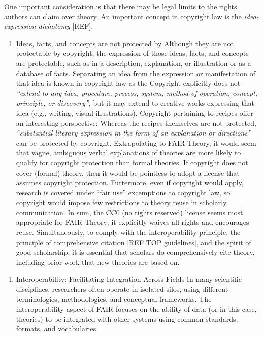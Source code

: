 \documentclass[
  man]{apa6}
\providecommand{\tightlist}{%
  \setlength{\itemsep}{0pt}\setlength{\parskip}{0pt}}
\begin{document}
One important consideration is that there may be legal limits to the rights authors can claim over theory.
An important concept in copyright law is the \emph{idea-expression dichotomy} {[}REF{]}.

\begin{enumerate}
\def\labelenumi{\alph{enumi}.}
\setcounter{enumi}{14}
\tightlist
\item
  Ideas, facts, and concepts are not protected by Although they are not protectable by copyright, the expression of those ideas, facts, and concepts are protectable, such as in a description, explanation, or illustration or as a database of facts. Separating an idea from the expression or manifestation of that idea is known in copyright law as the
  Copyright explicitly does not
  \emph{``extend to any idea, procedure, process, system, method of operation, concept, principle, or discovery''},
  but it may extend to creative works expressing that idea (e.g., writing, visual illustrations).
  Copyright pertaining to recipes offer an interesting perspective:
  Whereas the recipes themselves are not protected, \emph{``substantial literary expression in the form of an explanation or directions''} can be protected by copyright.
  Extrapolating to FAIR Theory, it would seem that vague, ambiguous verbal explanations of theories are more likely to qualify for copyright protection than formal theories.
  If copyright does not cover (formal) theory,
  then it would be pointless to adopt a license that assumes copyright protection.
  Furtermore, even if copyright would apply, research is covered under ``fair use'' excemptions to copyright law, so copyright would impose few restrictions to theory reuse in scholarly communication.
  In sum, the CC0 (no rights reserved) license seems most appropriate for FAIR Theory;
  it explicitly waives all rights and encourages reuse.
  Simultaneously, to comply with the interoperability principle, the principle of comprehensive citation {[}REF TOP guidelines{]},
  and the spirit of good scholarship,
  it is essential that scholars do comprehensively cite theory,
  including prior work that new theories are based on.
\end{enumerate}

\begin{enumerate}
\def\labelenumi{\arabic{enumi}.}
\setcounter{enumi}{2}
\tightlist
\item
  Interoperability: Facilitating Integration Across Fields
  In many scientific disciplines, researchers often operate in isolated silos, using different terminologies, methodologies, and conceptual frameworks. The interoperability aspect of FAIR focuses on the ability of data (or in this case, theories) to be integrated with other systems using common standards, formats, and vocabularies.
\end{enumerate}
\end{document}
